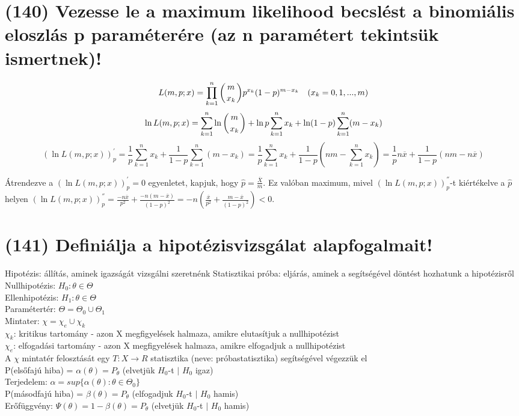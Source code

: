\documentclass[12p]{article}
\begin{document}
\section{(140) Vezesse le a maximum likelihood becslést a binomiális eloszlás p paraméterére (az n paramétert tekintsük ismertnek)!}

$$L(m, p; x) = \prod_{k=1}^n \displaystyle{\left({m \atop x_k}\right)}p^{x_k}(1-p)^{m-x_k} \quad (x_k = 0, 1, ..., m)$$
$$\ln L(m, p; x) = \sum^n_{k=1} \ln \left ({m \atop x_k}\right) + \ln p \sum^n_{k=1} x_k + \ln(1-p) \sum^n_{k=1}(m-x_k)$$
$$(\ln L(m,p;x))^{'}_p = \frac{1}{p} \sum^n_{k=1}x_k + \frac{1}{1-p} \sum^n_{k=1} (m - x_k) = \frac{1}{p} \sum^n_{k=1}x_k + \frac{1}{1-p}
\left(nm- \sum^n_{k=1}x_k \right) = \frac{1}{p}n\overline{x} + \frac{1}{1-p}(nm-n\overline{x})$$

Átrendezve a $(\ln L(m,p;x))^{'}_p = 0$ egyenletet, kapjuk, hogy $\hat{p} = \frac{\overline{X}}{m}$.  Ez valóban maximum, mivel $(\ln L(m,p;x))^{''}_p$-t kiértékelve a $\hat{p}$ helyen $(\ln L(m,p;x))^{''}_p = \frac{-n \overline{x}}{p^2} + \frac{-n(m-\overline{x})}{(1-p)^2}=
-n\left(\frac{\overline{x}}{p^2}+\frac{m - \overline{x}}{(1-p)^2}\right)<0$.

\section{(141) Definiálja a hipotézisvizsgálat alapfogalmait!}

Hipotézis: állítás, aminek igazságát vizsgálni szeretnénk
Statisztikai próba: eljárás, aminek a segítségével döntést hozhatunk a hipotézisről
Nullhipotézis: $H_0 : \theta \in \Theta$\\
Ellenhipotézis: $H_1 : \theta \in \Theta$\\
Paramétertér: $\Theta = \Theta_0 \cup \Theta_1$\\
Mintater: $\chi = \chi_e \cup \chi_k$\\
$\chi_k$: kritikus tartomány - azon X megfigyelések halmaza, amikre elutasítjuk a nullhipotézist\\
$\chi_e$: elfogadási tartomány - azon X megfigyelések halmaza, amikre elfogadjuk a nullhipotézist\\
A $\chi$ mintatér felosztását egy $T : X \rightarrow R$ statisztika (neve: próbastatisztika) segítségével végezzük el\\
P(elsőfajú hiba) = $\alpha(\theta) = P_\theta$ (elvetjük $H_0$-t $|$ $H_0$ igaz)\\
Terjedelem: $\alpha = sup\{\alpha(\theta) : \theta \in \Theta_0\}$\\
P(másodfajú hiba) = $\beta(\theta) = P_\theta$ (elfogadjuk $H_0$-t $|$ $H_0$ hamis)\\
Erőfüggvény: $\Psi(\theta) = 1 - \beta(\theta) = P_\theta$ (elvetjük $H_0$-t $|$ $H_0$ hamis)
\end{document}

